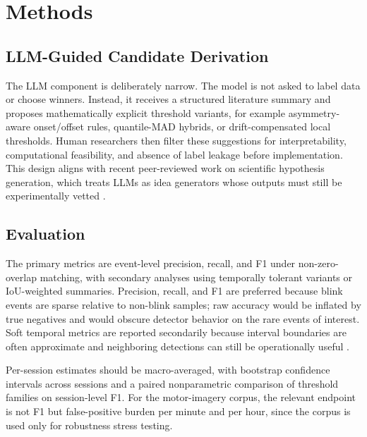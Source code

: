 \section{Methods}

\subsection{LLM-Guided Candidate Derivation}

The LLM component is deliberately narrow. The model is not asked to label data or choose winners. Instead, it receives a structured literature summary and proposes mathematically explicit threshold variants, for example asymmetry-aware onset/offset rules, quantile-MAD hybrids, or drift-compensated local thresholds. Human researchers then filter these suggestions for interpretability, computational feasibility, and absence of label leakage before implementation. This design aligns with recent peer-reviewed work on scientific hypothesis generation, which treats LLMs as idea generators whose outputs must still be experimentally vetted \citep{gottweis2025toward}.

\subsection{Evaluation}

The primary metrics are event-level precision, recall, and F1 under non-zero-overlap matching, with secondary analyses using temporally tolerant variants or IoU-weighted summaries. Precision, recall, and F1 are preferred because blink events are sparse relative to non-blink samples; raw accuracy would be inflated by true negatives and would obscure detector behavior on the rare events of interest. Soft temporal metrics are reported secondarily because interval boundaries are often approximate and neighboring detections can still be operationally useful \citep{saito2015precision,salles2024softed}.

Per-session estimates should be macro-averaged, with bootstrap confidence intervals across sessions and a paired nonparametric comparison of threshold families on session-level F1. For the motor-imagery corpus, the relevant endpoint is not F1 but false-positive burden per minute and per hour, since the corpus is used only for robustness stress testing.

